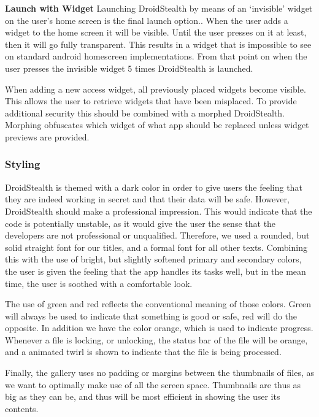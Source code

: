 \textbf{Launch with Widget}
Launching DroidStealth by means of an `invisible' widget on the user's home screen is the final launch option.. 
When the user adds a widget to the home screen it will be visible.
Until the user presses on it at least, then it will go fully transparent.
This results in a widget that is impossible to see on standard android homescreen implementations.
From that point on when the user presses the invisible widget 5 times DroidStealth is launched.

When adding a new access widget, all previously placed widgets become visible. 
This allows the user to retrieve widgets that have been misplaced.
To provide additional security this should be combined with a morphed DroidStealth.
Morphing obfuscates which widget of what app should be replaced unless widget previews are provided.

\subsubsection{Styling}
DroidStealth is themed with a dark color in order to give users the feeling that they are indeed
working in secret and that their data will be safe. However, DroidStealth should
make a professional impression. This would indicate that the code is potentially unstable, 
as it would give the user the sense that the developers are not professional or unqualified. 
Therefore, we used a rounded, but solid straight font for our titles, and a formal font for 
all other texts. Combining this with the use of bright, but slightly softened primary and 
secondary colors, the user is given the feeling that the app handles its tasks well, but in 
the mean time, the user is soothed with a comfortable look. %

The use of green and red reflects the conventional meaning of those colors. Green
will always be used to indicate that something is good or safe, red will do the opposite. 
In addition we have the color orange, which is used to indicate progress. Whenever a file is 
locking, or unlocking, the status bar of the file will be orange, and a animated twirl is shown 
to indicate that the file is being processed. %

Finally, the gallery uses no padding or margins between the thumbnails of files, as we want
to optimally make use of all the screen space. Thumbnails are thus as big as they can be, 
and thus will be most efficient in showing the user its contents. 
